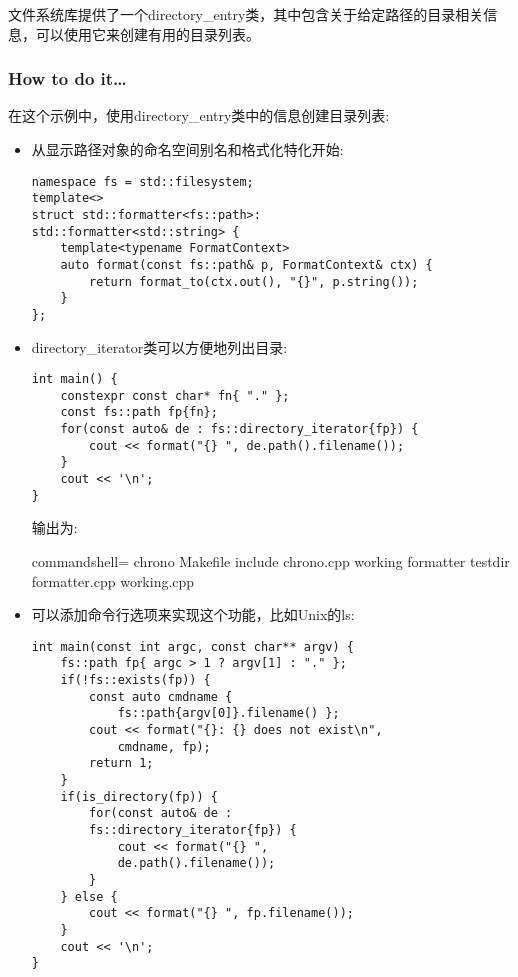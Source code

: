 

文件系统库提供了一个directory\_entry类，其中包含关于给定路径的目录相关信息，可以使用它来创建有用的目录列表。

\subsubsection{How to do it…}

在这个示例中，使用directory\_entry类中的信息创建目录列表:

\begin{itemize}
\item 
从显示路径对象的命名空间别名和格式化特化开始:

\begin{lstlisting}[style=styleCXX]
namespace fs = std::filesystem;
template<>
struct std::formatter<fs::path>:
std::formatter<std::string> {
	template<typename FormatContext>
	auto format(const fs::path& p, FormatContext& ctx) {
		return format_to(ctx.out(), "{}", p.string());
	}
};
\end{lstlisting}

\item 
directory\_iterator类可以方便地列出目录:

\begin{lstlisting}[style=styleCXX]
int main() {
	constexpr const char* fn{ "." };
	const fs::path fp{fn};
	for(const auto& de : fs::directory_iterator{fp}) {
		cout << format("{} ", de.path().filename());
	}
	cout << '\n';
}
\end{lstlisting}

输出为:

\begin{tcblisting}{commandshell={}}
chrono Makefile include chrono.cpp working formatter
testdir formatter.cpp working.cpp
\end{tcblisting}

\item 
可以添加命令行选项来实现这个功能，比如Unix的ls:

\begin{lstlisting}[style=styleCXX]
int main(const int argc, const char** argv) {
	fs::path fp{ argc > 1 ? argv[1] : "." };
	if(!fs::exists(fp)) {
		const auto cmdname {
			fs::path{argv[0]}.filename() };
		cout << format("{}: {} does not exist\n",
			cmdname, fp);
		return 1;
	}
	if(is_directory(fp)) {
		for(const auto& de :
		fs::directory_iterator{fp}) {
			cout << format("{} ",
			de.path().filename());
		}
	} else {
		cout << format("{} ", fp.filename());
	}
	cout << '\n';
}
\end{lstlisting}


\end{itemize}
